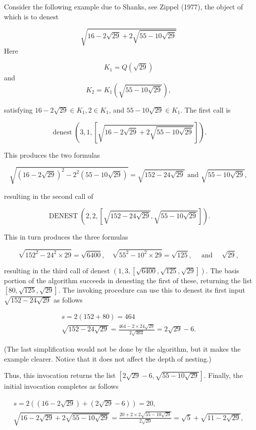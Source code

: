 \documentclass[11pt,letterpaper]{article}
\begin{document}
Consider the following example due to Shanks, see Zippel (1977), the object of which is to denest

\[
\sqrt{16-2 \sqrt{29}+2 \sqrt{55-10 \sqrt{29}}}
\]
Here

\[
K_1=Q(\sqrt{29})
\]
and
\[
K_{2}=K_{1}(\sqrt{55-10 \sqrt{29}}),
\]

satisfying $16-2 \sqrt{29} \in K_{1}, 2 \in K_{1}$, and $55-10 \sqrt{29} \in K_{1}$. The first call is

\[
\operatorname{denest}(3,1,[\sqrt{16-2 \sqrt{29}+2 \sqrt{55-10 \sqrt{29}}}]) .
\]

This produces the two formulas

\[
\sqrt{(16-2 \sqrt{29})^{2}-2^{2}(55-10 \sqrt{29})}=\sqrt{152-24 \sqrt{29}} \text { and } \sqrt{55-10 \sqrt{29}},
\]

resulting in the second call of

\[
\operatorname{DENEST}(2,2,[\sqrt{152-24 \sqrt{29}}, \sqrt{55-10 \sqrt{29}}]) .
\]

This in turn produces the three formulas

\[
\sqrt{152^{2}-24^{2} \times 29}=\sqrt{6400}, \quad \sqrt{55^{2}-10^{2} \times 29}=\sqrt{125}, \quad \text { and } \quad \sqrt{29},
\]

resulting in the third call of denest $(1,3,[\sqrt{6400}, \sqrt{125}, \sqrt{29}])$. The basis portion of the algorithm succeeds in denesting the first of these, returning the list $[80, \sqrt{125}, \sqrt{29}]$. The invoking procedure can use this to denest its first input $\sqrt{152-24 \sqrt{29}}$ as follows

\[
\begin{gathered}
s=2(152+80)=464 \\
\sqrt{152-24 \sqrt{29}}=\frac{464-2 \times 24 \sqrt{29}}{2 \sqrt{464}}=2 \sqrt{29}-6 .
\end{gathered}
\]

(The last simplification would not be done by the algorithm, but it makes the example clearer. Notice that it does not affect the depth of nesting.)

Thus, this invocation returns the list $[2 \sqrt{29}-6, \sqrt{55-10 \sqrt{29}}]$. Finally, the initial invocation completes as follows

\[
\begin{gathered}
s=2((16-2\sqrt{29})+(2\sqrt{29}-6))=20, \\
\sqrt{16-2 \sqrt{29}+2 \sqrt{55-10 \sqrt{29}}}=\frac{20+2 \times 2 \sqrt{55-10 \sqrt{29}}}{2 \sqrt{20}}=\sqrt{5}+\sqrt{11-2 \sqrt{29}},
\end{gathered}
\]
\end{document}
